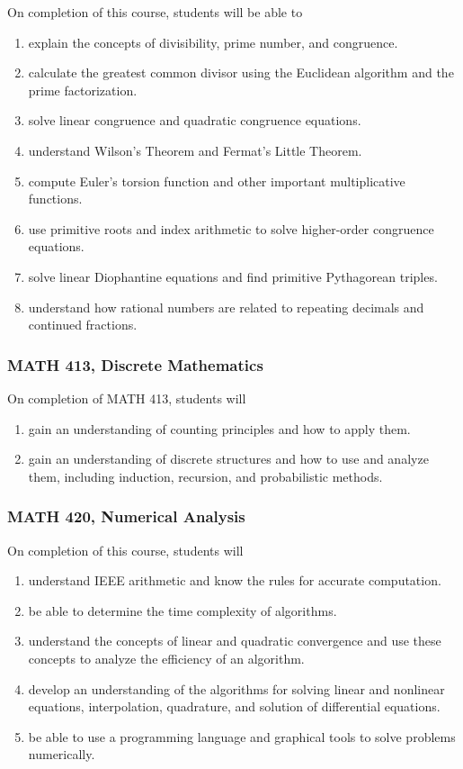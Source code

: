 \documentclass[11pt]{article}
\newenvironment{alphalist}{
\begin{enumerate}[label=(\arabic*),widest=107 ,leftmargin=25pt, itemsep=0pt]}
{\end{enumerate}}
\begin{document}
On completion of this course, students will be able to
\begin{alphalist}
    \item explain the concepts of divisibility, prime number, and congruence. 
    \item calculate the greatest common divisor using the Euclidean algorithm and the prime factorization.
    \item solve linear congruence and quadratic congruence equations.
    \item understand Wilson's Theorem and Fermat's Little Theorem. 
    \item compute Euler's torsion function and other important multiplicative functions.
    \item use primitive roots and index arithmetic to solve higher-order congruence equations.  
    \item solve linear Diophantine equations and find primitive Pythagorean triples.
    \item understand how rational numbers are related to repeating decimals and continued fractions.
\end{alphalist}

\subsubsection*{MATH 413, Discrete Mathematics}

On completion of MATH 413, students will 
\begin{alphalist}
    \item gain an understanding of counting principles and how to apply them.
    \item gain an understanding of discrete structures and how to use and analyze them, including induction, recursion, and probabilistic methods.
\end{alphalist}

\subsubsection*{MATH 420, Numerical Analysis}

On completion of this course, students will
\begin{alphalist}
    \item understand IEEE arithmetic and know the rules for accurate computation.
    \item be able to determine the time complexity of algorithms.
    \item understand the concepts of linear and quadratic convergence and use these concepts to analyze the efficiency of an algorithm.
    \item develop an understanding of the algorithms for solving linear and nonlinear equations, interpolation, 
       quadrature, and solution of differential equations.
    \item be able to use a programming language and graphical tools to solve problems numerically.
\end{alphalist}
\end{document}
